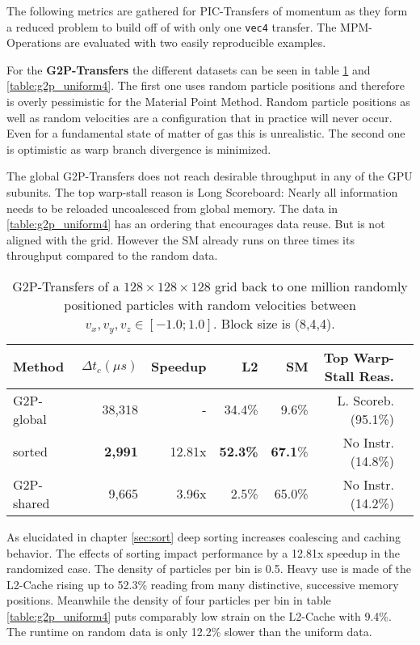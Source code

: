 \documentclass[m,times]{cgMA}
\begin{document}
The following metrics are gathered for PIC-Transfers of momentum as they form a reduced problem to build off of with only one \texttt{vec4} transfer. The MPM-Operations are evaluated with two easily reproducible examples.

For the \textbf{G2P-Transfers} the different datasets can be seen in table \ref{table:g2p_random} and \ref{table:g2p_uniform4}. The first one uses random particle positions and therefore is overly pessimistic for the Material Point Method. Random particle positions as well as random velocities are a configuration that in practice will never occur. Even for a fundamental state of matter of gas this is unrealistic. The second one is optimistic as warp branch divergence is minimized.

The global G2P-Transfers does not reach desirable throughput in any of the GPU subunits. The top warp-stall reason is Long Scoreboard: Nearly all information needs to be reloaded uncoalesced from global memory. The data in \ref{table:g2p_uniform4} has an ordering that encourages data reuse. But is not aligned with the grid. However the SM already runs on three times its throughput compared to the random data.

\begin{table}[htpb]
  \begin{tabular}{ | l | r | r | r | r | r |r|}    \hline
    Method                 &  $\Delta t_c(\mu s)$ &Speedup         & L2    &SM     &Top Warp-Stall Reas. \\\hline
    G2P-global             &   38,318             &-               &34.4\% & 9.6\% &L. Scoreb.(95.1\%)  \\\hline
    sorted                 &    \textbf{2,991}    &12.81x          &\textbf{52.3\%}&\textbf{67.1}\% &No Instr.(14.8\%)   \\\hline
    G2P-shared             &    9,665             & 3.96x          & 2.5\% &65.0\% &No Instr.(14.2\%)\\\hline
 \end{tabular}
 \caption{G2P-Transfers of a $128\times 128\times128$ grid back to one million randomly positioned particles with random velocities between $v_x,v_y,v_z \in [-1.0;1.0]$. Block size is (8,4,4).}\label{table:g2p_random}
\end{table}

As elucidated in chapter \ref{sec:sort} deep sorting increases coalescing and caching behavior. The effects of sorting impact performance by a 12.81x speedup in the randomized case. The density of particles per bin is 0.5. Heavy use is made of the L2-Cache rising up to 52.3\% reading from many distinctive, successive memory positions. Meanwhile the density of four particles per bin in table \ref{table:g2p_uniform4} puts comparably low strain on the L2-Cache with 9.4\%. The runtime on random data is only 12.2\% slower than the uniform data.
\end{document}
